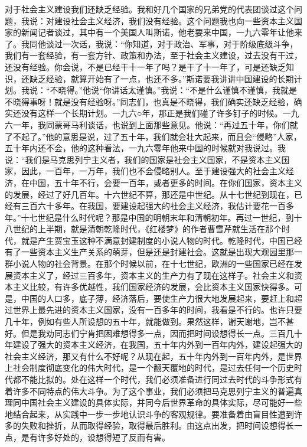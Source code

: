 对于社会主义建设我们还缺乏经验。我和好几个国家的兄弟党的代表团谈过这个问题，我说：对建设社会主义经济，我们没有经验。这个问题我也向一些资本主义国家的新闻记者谈过，其中有一个美国人叫斯诺，他老要来中国，一九六零年让他来了。我同他谈过一次话，我说：“你知道，对于政治、军事，对于阶级底级斗争，我们有一套经验，有一套方针、政策和办法，至于社会主义建设，过去没有干过，还没有经验。你会说，不是已经干十一年了吗？是干了十一年了，可是还缺乏知识，还缺乏经验，就算开始有了一点，也还不多。”斯诺要我讲讲中国建设的长期计划。我说：“不晓得。”他说“你讲话太谨慎。”我说：“不是什么谨慎不谨慎，我就是不晓得事呀！就是没有经验呀。”同志们，也真是不晓得，我们确实还缺乏经验，确实还没有这样一个长期计划。一九六○年，那正是我们碰了许多钉子的时候。一九六一年，我同蒙哥马利谈话，也说到上面那些意见。他说：“再过五十年，你们就了不起了。”他的意思是说，过了五十年，我们就会壮大起来，而且会“侵略”人家，五十年内还不会，他的这种看法，一九六零年他来中国的时候就对我说过。我说：“我们是马克思列宁主义者，我们的国家是社会主义国家，不是资本主义国家，因此，一百年，一万年，我们也不会侵略别人。至于建设强大的社会主义经济，在中国，五十年不行，会要一百年，或者更多的时间。在你们国家，资本主义的发展，经过了好几百年。十六世纪不算，那还是中世纪。从十七世纪到现在，已经有三百六十多年。在我国，要建设起强大的社会主义经济，我估计要花一百多年。”十七世纪是什么时代呢？那是中国的明朝末年和清朝初年。再过一世纪，到十八世纪的上半期，就是清朝乾隆时代，《红楼梦》的作者曹雪芹就生活在那个时代，就是产生贾宝玉这种不满意封建制度的小说人物的时代。乾隆时代，中国已经有了一些资本主义生产关系的萌芽，但是还是封建社会。这就是出现大观园里那一群小说人物的社会背景。在那个时候以前，在十七世纪，欧洲的一些国家已经在发展资本主义了，经过三百多年，资本主义的生产力有了现在这样子。社会主义和资本主义比较，有许多优越性，我们国家经济的发展，会比资本主义国家快得多。可是，中国的人口多，底子薄，经济落后，要使生产力很大地发展起来，要赶上和超过世界上最先进的资本主义国家，没有一百多年的时间，我看是不行的。也许只要几十年，例如有些人所设想的五十年，就能做到。果然这样，谢天谢地，岂不甚好。但是我劝同志们宁肯把困难想得多一点，因而把时间设想得长一点。三百几十年建设了强大的资本主义经济，在我国，五十年内外到一百年内外，建设起强大的社会主义经济，那又有什么不好呢？从现在起，五十年内外到一百年内外，是世界上社会制度彻底变化的伟大时代，是一个翻天覆地的时代，是过去任何一个历史时代都不能比拟的。处在这样一个时代，我们必须准备进行同过去时代的斗争形式有着许多不同特点的伟大斗争。为了这个事业，我们必须把马克思列宁主义的普遍真理同中国社会主义建设的具体实际，并同今后世界革命的具体实际，尽可能好一些地结合起来，从实践中一步一步地认识斗争的客观规律。要准备着由盲目性遭到许多的失败和挫折，从而取得经验，取得最后胜利。由这点出发，把时间设想得长一点，是有许多好处的，设想得短了反而有害。

